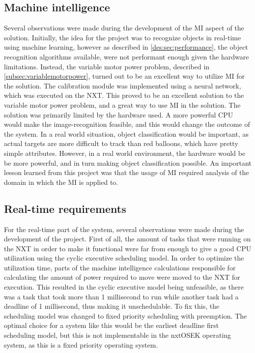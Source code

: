 \subsection{Machine intelligence}
Several observations were made during the development of the MI aspect of the solution.
Initially, the idea for the project was to recognize objects in real-time using machine learning, however as described in \autoref{des:sec:performance}, the object recognition algorithms available, were not performant enough given the hardware limitations.
Instead, the variable motor power problem, described in \autoref{subsec:variablemotorpower}, turned out to be an excellent way to utilize MI for the solution.
The calibration module was implemented using a neural network, which was executed on the NXT.
This proved to be an excellent solution to the variable motor power problem, and a great way to use MI in the solution.
The solution was primarily limited by the hardware used.
A more powerful CPU would make the image-recognition feasible, and this would change the outcome of the system.
In a real world situation, object classification would be important, as actual targets are more difficult to track than red balloons, which have pretty simple attributes.
However, in a real world environment, the hardware would be be more powerful, and in turn making object classification possible.
An important lesson learned from this project was that the usage of MI required analysis of the domain in which the MI is applied to.


\subsection{Real-time requirements}
For the real-time part of the system, several observations were made during the development of the project.
First of all, the amount of tasks that were running on the NXT in order to make it functional were far from enough to give a good CPU utilization using the cyclic executive scheduling model.
In order to optimize the utilization time, parts of the machine intelligence calculations responsible for calculating the amount of power required to move were moved to the NXT for execution.
This resulted in the cyclic executive model being unfeasible, as there was a task that took more than 1 millisecond to run while another task had a deadline of 1 millisecond, thus making it unschedulable. 
To fix this, the scheduling model was changed to fixed priority scheduling with preemption.
The optimal choice for a system like this would be the earliest deadline first scheduling model, but this is not implementable in the nxtOSEK operating system, as this is a fixed priority operating system.

